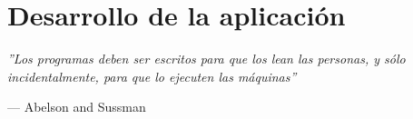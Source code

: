 \chapter{Desarrollo de la aplicación}

\epigraph{\textit{''Los programas deben ser escritos para que los lean las personas, y sólo incidentalmente, para que lo ejecuten las máquinas''}}{--- Abelson and Sussman}

\begin{comment}
Tras haber explicado en el capítulo anterior las diversas herramientas a usar para el desarrollo de la aplicación, en este capítulo se explicaran aspectos sobre el diseño de la aplicación y las diferentes decisiones tomadas a la hora de realizar dicho diseño.

El diseño de la aplicación es simple minimista. El objetivo del proyecto consiste en hacer una aplicación lo mas fácil de usar y con la mayor claridad posible de cara al usuario. Por ello, se ha optado por un enfoque que reduzca el numero de elementos al mínimo, ademas de que se adapta perfectamente a los estándares de diseño de Materia Design, que son los recomendados a la hora de diseñar aplicaciones para Android.

\section{Interfaz gráfica}

Para la interfaz gráfica se ha optado por hacer un diseño primero en papel para después, en base a ese diseño y esa distribución de ventanas, elaborar en Android Studio toda la interfaz gráfica. Se puede observar un diseño primitivo en la siguiente imagen.

\begin{figure}[H] %
	\centering
	\texttt{[image: placeholder]}
	\caption{Mockup inicial de la GUI de la aplicación}
	\label{fig:mockup}
\end{figure}

La aplicación esta dividida en varias vistas. Debido a que el objetivo principal de la aplicación es que sea lo mas simple posible, se ha diseñado buscando minimizar el numero de ventanas de la aplicación.

A la hora de crear las vistas en Android se usan dos conceptos. \textit{Activity} y \textit{Fragment}. En Android, una Activity representa una parte de la UI de una aplicación, y tiene su propio ciclo de vida y su propia jerarquía de elementos. Una aplicación Android dispone de tantas Activity como el usuario quiera implementar, entendiendo que cada Activity servirá para mostrar cierta información e interactúa con el usuario de una manera concreta. A continuación se muestra el ciclo de vida de una Activity, con los métodos que se ejecutan en ciertos puntos


\end{comment}
